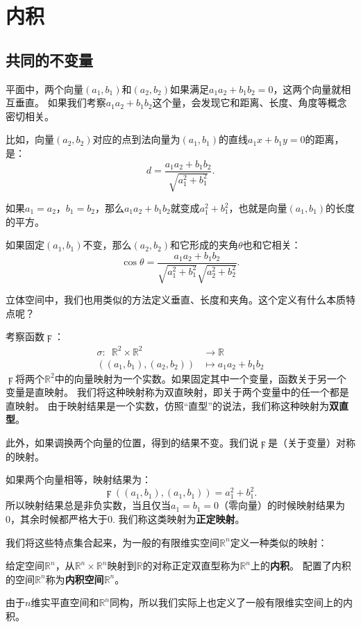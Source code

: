 \documentclass[12pt,UTF8,fontset=none]{ctexbook}
\begin{document}
\section{内积}
\subsection{共同的不变量}
平面中，两个向量$(a_1, b_1)$和$(a_2, b_2)$如果满足$a_1a_2 + b_1b_2 = 0$，这两个向量就相互垂直。
如果我们考察$a_1a_2 + b_1b_2$这个量，会发现它和距离、长度、角度等概念密切相关。

比如，向量$(a_2, b_2)$对应的点到法向量为$(a_1, b_1)$的直线$a_1x + b_1y = 0$的距离，是：
$$ d = \frac{a_1a_2 + b_1b_2}{\sqrt{a_1^2 + b_1^2}}. $$

如果$a_1 = a_2$，$b_1 = b_2$，那么$ a_1a_2 + b_1b_2$就变成$a_1^2 + b_1^2$，也就是向量$(a_1, b_1)$的长度的平方。

如果固定$(a_1, b_1)$不变，那么$(a_2, b_2)$和它形成的夹角$\theta$也和它相关：
$$ \cos \theta = \frac{a_1a_2 + b_1b_2}{\sqrt{a_1^2 + b_1^2}\sqrt{a_2^2 + b_2^2}}. $$

立体空间中，我们也用类似的方法定义垂直、长度和夹角。这个定义有什么本质特点呢？

考察函数$\digamma$：
\begin{align*}
    \sigma: \,\,\,\mathbb{R}^2 \times \mathbb{R}^2 &\rightarrow \mathbb{R}  \\
    \left((a_1, b_1) , (a_2, b_2)\right) &\mapsto a_1a_2 + b_1b_2 
\end{align*}
$\digamma$将两个$\mathbb{R}^2$中的向量映射为一个实数。如果固定其中一个变量，函数关于另一个变量是直映射。
我们将这种映射称为双直映射，即关于两个变量中的任一个都是直映射。
由于映射结果是一个实数，仿照“直型”的说法，我们称这种映射为\textbf{双直型}。

此外，如果调换两个向量的位置，得到的结果不变。我们说$\digamma$是（关于变量）对称的映射。

如果两个向量相等，映射结果为：
$$\digamma\left((a_1, b_1) , (a_1, b_1)\right) = a_1^2 + b_1^2.$$
所以映射结果总是非负实数，当且仅当$a_1 = b_1 = 0$（零向量）的时候映射结果为0，其余时候都严格大于0.
我们称这类映射为\textbf{正定映射}。

我们将这些特点集合起来，为一般的有限维实空间$\mathbb{R}^n$定义一种类似的映射：

\begin{df}\label{df:7_1}
    给定空间$\mathbb{R}^n$，从$\mathbb{R}^n \times \mathbb{R}^n$映射到$\mathbb{R}$的对称正定双直型称为$\mathbb{R}^n$上的\textbf{内积}。
    配置了内积的空间$\mathbb{R}^n$称为\textbf{内积空间}$\mathbb{R}^n$。
\end{df}
由于$n$维实平直空间和$\mathbb{R}^n$同构，所以我们实际上也定义了一般有限维实空间上的内积。
\end{document}
